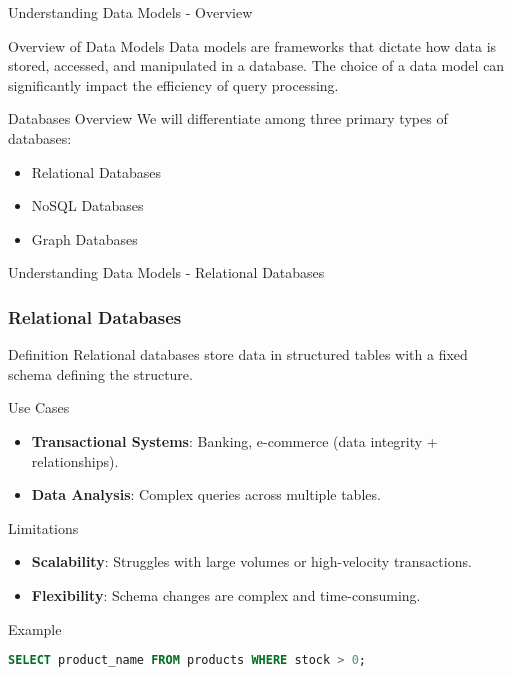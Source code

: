 \documentclass[aspectratio=169]{beamer}
\begin{document}
\begin{frame}[fragile]{Understanding Data Models - Overview}
    \begin{block}{Overview of Data Models}
        Data models are frameworks that dictate how data is stored, accessed, and manipulated in a database. The choice of a data model can significantly impact the efficiency of query processing. 
    \end{block}
    \begin{block}{Databases Overview}
        We will differentiate among three primary types of databases:
        \begin{itemize}
            \item Relational Databases
            \item NoSQL Databases
            \item Graph Databases
        \end{itemize}
    \end{block}
\end{frame}

\begin{frame}[fragile]{Understanding Data Models - Relational Databases}
    \frametitle{Relational Databases}

    \begin{block}{Definition}
        Relational databases store data in structured tables with a fixed schema defining the structure.
    \end{block}

    \begin{block}{Use Cases}
        \begin{itemize}
            \item \textbf{Transactional Systems}: Banking, e-commerce (data integrity + relationships).
            \item \textbf{Data Analysis}: Complex queries across multiple tables.
        \end{itemize}
    \end{block}

    \begin{block}{Limitations}
        \begin{itemize}
            \item \textbf{Scalability}: Struggles with large volumes or high-velocity transactions.
            \item \textbf{Flexibility}: Schema changes are complex and time-consuming.
        \end{itemize}
    \end{block}

    \begin{block}{Example}
        \begin{lstlisting}[language=SQL]
SELECT product_name FROM products WHERE stock > 0;
        \end{lstlisting}
    \end{block}
\end{frame}
\end{document}
